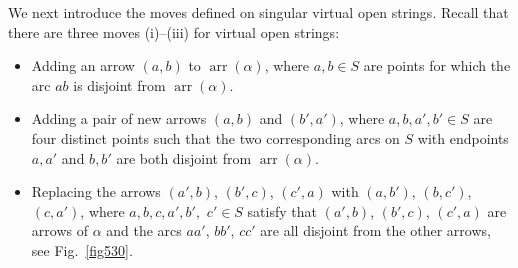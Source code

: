 \documentclass[12pt]{amsart}
\theoremstyle{noparens}
\numberwithin{equation}{section}
\numberwithin{equation}{section}
\begin{document}
We next introduce the moves defined on singular virtual open strings.
Recall that there are three moves (i)--(iii) for virtual open strings:
\begin{itemize}
	\item[(i)] Adding an arrow $(a, b)$ to $\operatorname{arr}(\alpha)$, where $a, b \in S$ are points for which the arc $ab$ is disjoint from $\operatorname{arr}(\alpha)$.
	\item[(ii)] Adding a pair of new arrows $(a, b)$ and $(b',a')$, where $a, b, a', b' \in S$ are four distinct points such that the two corresponding arcs on $S$ with endpoints $a,a'$ and $b,b'$ are both disjoint from $\operatorname{arr}(\alpha)$.
	\item[(iii)] Replacing the arrows $(a',b)$, $(b',c)$, $(c',a)$ with $(a, b')$, $(b, c')$, $(c, a')$, where $a, b, c, a', b',$ $c' \in S$ satisfy that $(a',b)$, $(b',c)$, $(c',a)$ are arrows of $\alpha$ and the arcs $aa'$, $bb'$, $cc'$ are all disjoint from the other arrows, see Fig.~\ref{fig530}. 
\end{itemize}
\end{document}
